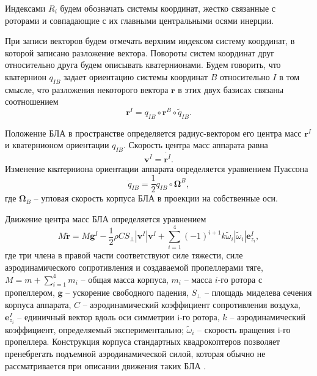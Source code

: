 Индексами $R_i$ будем обозначать системы координат, жестко связанные с роторами и совпадающие с их главными центральными осями инерции.

При записи векторов будем отмечать верхним индексом систему координат, в которой записано разложение вектора. Повороты систем координат друг относительно друга будем описывать кватернионами. Будем говорить, что кватернион $q_{IB}$ задает ориентацию системы координат $B$ относительно $I$ в том смысле, что разложения некоторого вектора $\bm{r}$ в этих двух базисах связаны соотношением
\begin{equation} \label{eq:m_quat}
\bm{r}^I = q_{IB} \circ \bm{r}^B \circ \tilde{q}_{IB}.
\end{equation}

Положение БЛА в пространстве определяется радиус-вектором его центра масс $\bm{r}^I$ и кватернионом ориентации $q_{IB}$. Скорость центра масс аппарата равна
\begin{equation} \label{eq:m_vel}
\bm{v}^I = \dot{\bm{r}^I}.
\end{equation}
Изменение кватерниона ориентации аппарата определяется уравнением Пуассона
\begin{equation} \label{eq:m_puasson}
\dot{q}_{IB} = \frac{1}{2} {q}_{IB} \circ \bm{\Omega}^B,
\end{equation}
где $\bm{\Omega}_B$ – угловая скорость корпуса БЛА в проекции на собственные оси.

Движение центра масс БЛА определяется уравнением
\begin{equation} \label{eq:m_traslational_motion}
M \ddot{\bm{r}} = M \bm{g}^I - \frac{1}{2} \rho C S_{\perp} |\bm{v}^I| \bm{v}^I + \sum_{i=1}^{4}{ { (-1)^{i+1} k \tilde \omega_i |\tilde \omega_i| \bm{e}^I_{z_i}}},
\end{equation}
где три члена в правой части соответствуют силе тяжести, силе аэродинамического сопротивления и создаваемой пропеллерами тяге, $M = m + \sum_{i=1}^{4}{m_i}$ – общая масса корпуса, $m_i$ – масса $i$-го ротора с пропеллером, $\bm g$ – ускорение свободного падения, $S_{\perp}$ – площадь миделева сечения корпуса аппарата, $C$ – аэродинамический коэффициент сопротивления воздуха, $\bm{e}^I_{z_i}$ – единичный вектор вдоль оси симметрии i-го ротора, $k$ – аэродинамический коэффициент, определяемый экспериментально; $\tilde \omega_i$ – скорость вращения i-го пропеллера. Конструкция корпуса стандартных квадрокоптеров позволяет пренебрегать подъемной аэродинамической силой, которая обычно не рассматривается при описании движения таких БЛА \cite{Biard01}.

